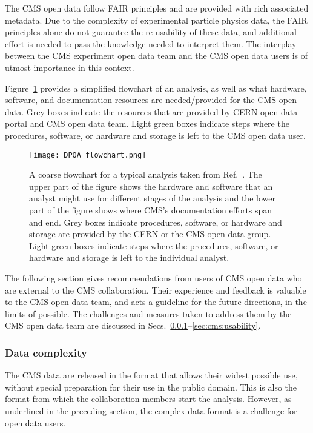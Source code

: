\documentclass[10pt]{article}
\begin{document}
The CMS open data follow FAIR principles and are provided with rich associated metadata.  Due to the complexity of experimental particle physics data, the FAIR principles alone do not guarantee the re-usability of these data, and additional effort is needed to pass the knowledge needed to interpret them. The interplay between the CMS experiment open data team and the CMS open data users is of utmost importance in this context. 

Figure~\ref{fig:flowchart} provides a simplified flowchart of an analysis, as well as what
hardware, software, and documentation resources are needed/provided for the CMS open data. Grey boxes indicate the resources that are provided by CERN open data portal and CMS open data team. Light green boxes indicate steps where the procedures, software, or hardware and storage is left to the CMS open data user.

\begin{figure}
	\centering
	\texttt{[image: DPOA\_flowchart.png]}
	\caption{A coarse flowchart for a typical analysis taken from Ref.~\cite{LassilaPerini2021}. The upper part of the figure shows the hardware and software that an analyst might use for different stages of the analysis and the lower part of the figure shows where CMS’s documentation efforts span and end. Grey boxes indicate procedures, software, or hardware and storage are provided by the CERN or the CMS open data group. Light green boxes indicate steps where the procedures, software, or hardware and storage is left to the individual analyst.}
	\label{fig:flowchart}
\end{figure}

The following section gives recommendations from users of CMS open data who are external to the CMS collaboration. Their experience and feedback is valuable to the CMS open data team, and acts a guideline for the future directions, in the limits of possible. The challenges and measures taken to address them by the CMS open data team are discussed in Secs.~\ref{sec:cms:complexity}--\ref{sec:cms:usability}.


\subsubsection{Data complexity}
\label{sec:cms:complexity}
The CMS data are released in the format that allows their widest possible use, without special preparation for their use in the public domain. This is also the format from which the collaboration members start the analysis. However, as underlined in the preceding section, the complex data format is a challenge for open data users.
\end{document}
